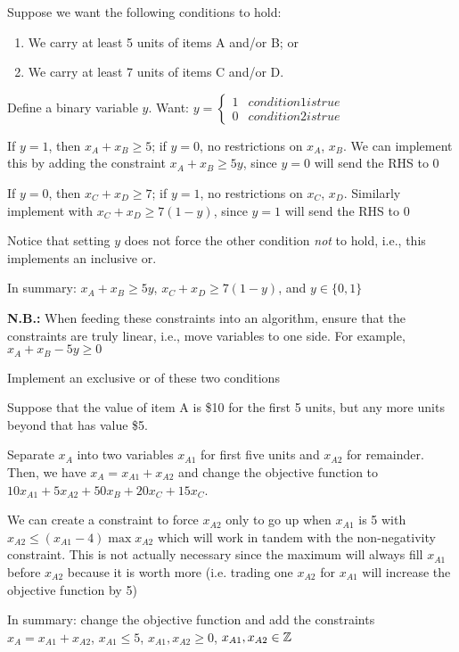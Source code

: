 \begin{example}
  Suppose we want the following conditions to hold:
  \begin{enumerate}[1.,nosep]
    \item We carry at least 5 units of items A and/or B; or
    \item We carry at least 7 units of items C and/or D.
  \end{enumerate}
\end{example}
\begin{sol}
  Define a binary variable $y$. Want: $y = \begin{cases*}1&condition 1 is true\\0&condition 2 is true\end{cases*}$

  If $y = 1$, then $x_A + x_B \geq 5$; if $y = 0$, no restrictions on $x_A$, $x_B$. We can implement this by adding the constraint $x_A + x_B \geq 5y$, since $y = 0$ will send the RHS to $0$

  If $y = 0$, then $x_C + x_D \geq 7$; if $y = 1$, no restrictions on $x_C$, $x_D$. Similarly implement with $x_C + x_D \geq 7(1-y)$, since $y=1$ will send the RHS to $0$

  Notice that setting $y$ does not force the other condition \emph{not} to hold, i.e., this implements an inclusive or.

  In summary: $x_A + x_B \geq 5y$, $x_C + x_D \geq 7(1-y)$, and $y \in \{0,1\}$

  \textbf{N.B.:} When feeding these constraints into an algorithm, ensure that the constraints are truly linear, i.e., move variables to one side. For example, $x_A + x_B - 5y \geq 0$
\end{sol}

\begin{xca}
  Implement an exclusive or of these two conditions
\end{xca}

\begin{example}
  Suppose that the value of item A is \$10 for the first 5 units, but any more units beyond that has value \$5.
\end{example}
\begin{sol}
  Separate $x_A$ into two variables $x_{A1}$ for first five units and $x_{A2}$ for remainder.
  Then, we have $x_A=x_{A1}+x_{A2}$ and change the objective function to $10x_{A1} + 5x_{A2} + 50x_B + 20x_C + 15x_C$.

  We can create a constraint to force $x_{A2}$ only to go up when $x_{A1}$ is 5 with $x_{A2} \leq (x_{A1} - 4)\max x_{A2}$ which will work in tandem with the non-negativity constraint. This is not actually necessary since the maximum will always fill $x_{A1}$ before $x_{A2}$ because it is worth more (i.e. trading one $x_{A2}$ for $x_{A1}$ will increase the objective function by 5)

  In summary: change the objective function and add the constraints $x_A = x_{A1} + x_{A2}$, $x_{A1} \leq 5$, $x_{A1},x_{A2} \geq 0$, $x_{A1}, x_{A2} \in \mathbb{Z}$
\end{sol}

